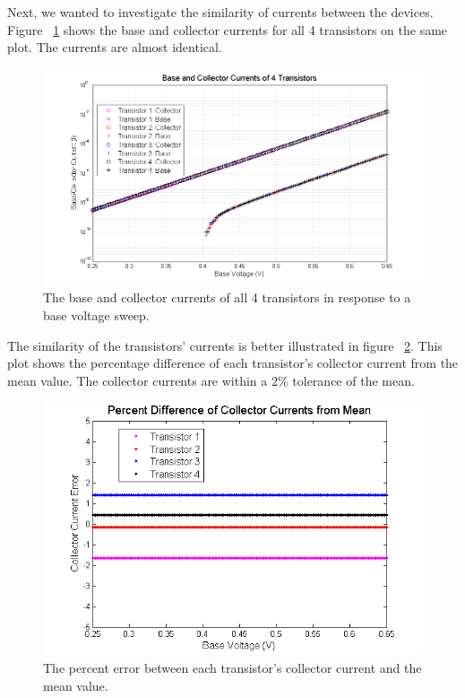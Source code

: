 \documentclass{article}
\begin{document}
Next, we wanted to investigate the similarity of currents between the devices. Figure ~\ref{fig:exp1a} shows the base and collector currents for all 4 transistors on the same plot. The currents are almost identical.

\begin{figure}[H]
\begin{center}
\includegraphics[scale=.6]{exp1a.png}
\caption{The base and collector currents of all 4 transistors in response to a base voltage sweep.}
\label{fig:exp1a}
\end{center}
\end{figure}

The similarity of the transistors' currents is better illustrated in figure ~\ref{fig:exp1b}. This plot shows the percentage difference of each transistor's collector current from the mean value. The collector currents are within a $2\%$ tolerance of the mean.

\begin{figure}[H]
\begin{center}
\includegraphics[scale=.6]{exp1d.png}
\caption{The percent error between each transistor's collector current and the mean value.}
\label{fig:exp1b}
\end{center}
\end{figure}
\end{document}
